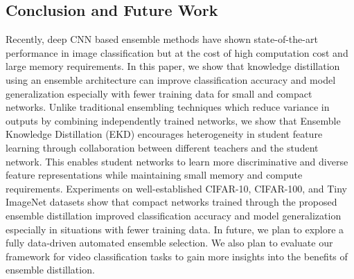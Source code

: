\documentclass{ecai}
\begin{document}
\subsection{Conclusion and Future Work}
Recently, deep CNN based ensemble methods have shown state-of-the-art performance in image classification but at the cost of high computation cost and large memory requirements.
In this paper, we show that knowledge distillation using an ensemble architecture can improve classification accuracy and model generalization especially with fewer training data for small and compact networks.
Unlike traditional ensembling techniques which reduce variance in outputs by combining independently trained networks, we show that Ensemble Knowledge Distillation (EKD) encourages heterogeneity in student feature learning through collaboration between different teachers and the student network. This enables student networks to learn more discriminative and diverse feature representations while maintaining small memory and compute requirements.  
Experiments on well-established CIFAR-10, CIFAR-100, and Tiny ImageNet datasets show that compact networks trained through the proposed ensemble distillation improved classification accuracy and model generalization especially in situations with fewer training data.
In future, we plan to explore a fully data-driven automated ensemble selection. We also plan to evaluate our framework for video classification tasks to gain more insights into the benefits of ensemble distillation.    


\end{document}
